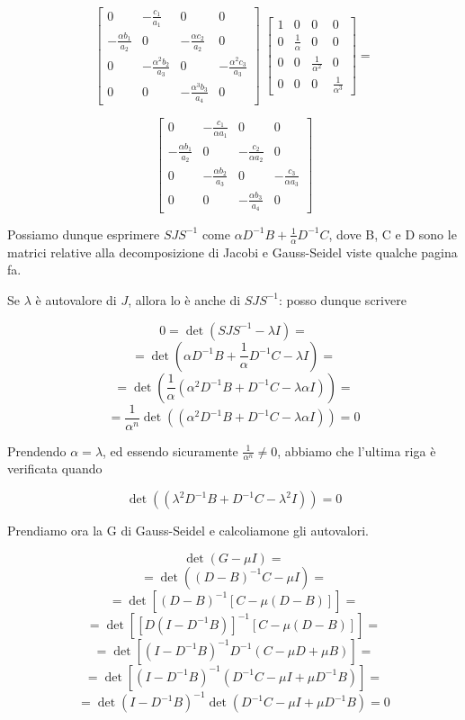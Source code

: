 \begin{thproof}
\[ \left[ \begin{array}{cccc}
0 & - \frac{c_1}{a_1} & 0 & 0 \\ 
- \frac{\alpha b_1}{a_2} & 0 & - \frac{\alpha c_2}{a_2} & 0 \\ 
0 & - \frac{\alpha^2 b_2}{a_3} & 0 & - \frac{\alpha^2 c_3}{a_3} \\ 
0 & 0 & - \frac{\alpha^3 b_3}{a_4} & 0
\end{array}  \right] \; \left[ \begin{array}{cccc}
1 & 0 & 0 & 0 \\ 
0 & \frac{1}{\alpha} & 0 & 0 \\ 
0 & 0 & \frac{1}{\alpha^2} & 0 \\ 
0 & 0 & 0 & \frac{1}{\alpha^3}
\end{array}  \right] = \]

\[\left[ \begin{array}{cccc}
0 & - \frac{c_1}{\alpha a_1} & 0 & 0 \\ 
- \frac{\alpha b_1}{a_2} & 0 & - \frac{c_2}{\alpha a_2} & 0 \\ 
0 & - \frac{\alpha b_2}{a_3} & 0 & - \frac{c_3}{\alpha a_3} \\ 
0 & 0 & - \frac{\alpha b_3}{a_4} & 0
\end{array}  \right] \]

Possiamo dunque esprimere $ SJS^{-1} $ come $ \alpha D^{-1}B + \frac{1}{\alpha} D^{-1}C $, dove B, C e D sono le matrici relative alla decomposizione di Jacobi e Gauss-Seidel viste qualche pagina fa.

Se $ \lambda $ \`e autovalore di $ J $, allora lo \`e anche di $ SJS^{-1} $: posso dunque scrivere

\[ 0 = \det (SJS^{-1} - \lambda I) = \]
\[ = \det (\alpha D^{-1}B + \frac{1}{\alpha} D^{-1}C - \lambda I) = \]
\[ = \det (\frac{1}{\alpha} (\alpha^2 D^{-1}B + D^{-1}C - \lambda \alpha I)) = \]
\[ = \frac{1}{\alpha^n} \det ((\alpha^2 D^{-1}B + D^{-1}C - \lambda \alpha I)) = 0 \]

Prendendo $ \alpha = \lambda $, ed essendo sicuramente $ \frac{1}{\alpha^n} \neq 0 $, abbiamo che l'ultima riga \`e verificata quando

\begin{equation} \label{eqn:autovalJ}
\det ((\lambda^2 D^{-1}B + D^{-1}C - \lambda^2 I)) = 0
\end{equation} 

Prendiamo ora la G di Gauss-Seidel e calcoliamone gli autovalori.

$$ \det(G - \mu I) = $$
$$ = \det \left( \left( D-B \right)^{-1} C - \mu I  \right) = $$
$$ = \det \left[ \left( D-B \right)^{-1} \left[  C - \mu \left( D-B\right) \right] \right] = $$
\[ = \det \left[ \left[ D \left( I - D^{-1}B \right) \right] ^{-1} \left[ C - \mu \left( D-B\right) \right] \right] = \]
$$ = \det \left[ \left( I -D^{-1}B \right)^{-1} D^{-1} \left( C- \mu D + \mu B \right) \right] = $$
\[ = \det \left[ \left( I -D^{-1}B \right)^{-1} \left( D^{-1}C - \mu I + \mu D^{-1} B \right) \right] = \]
\[ = \det \left( I -D^{-1}B \right)^{-1} \det \left( D^{-1}C - \mu I + \mu D^{-1} B \right) = 0 \]


\end{thproof}
